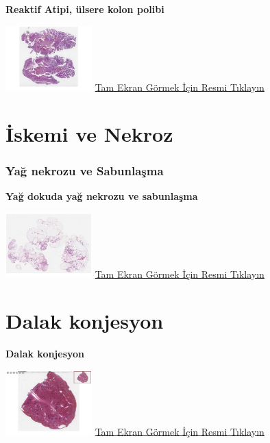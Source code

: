 \documentclass[
  letterpaper,
  DIV=11,
  numbers=noendperiod]{scrreprt}
\begin{document}
\textbf{Reaktif Atipi, ülsere kolon polibi}

\href{https://images.patolojiatlasi.com/reactive-atypia/HE.html}{\includegraphics[width=0.25\textwidth,height=\textheight]{./screenshots/thumbnail_reactive-atypia.png}}
\href{https://images.patolojiatlasi.com/reactive-atypia/HE.html}{Tam
Ekran Görmek İçin Resmi Tıklayın}

\hypertarget{sec-iskemi-ve-nekroz}{%
\chapter{İskemi ve Nekroz}\label{sec-iskemi-ve-nekroz}}

\hypertarget{sec-yag-nekrozu-sabunlasma}{%
\subsection{Yağ nekrozu ve
Sabunlaşma}\label{sec-yag-nekrozu-sabunlasma}}

\textbf{Yağ dokuda yağ nekrozu ve sabunlaşma}

\href{https://images.patolojiatlasi.com/fat-necrosis/HE.html}{\includegraphics[width=0.25\textwidth,height=\textheight]{./screenshots/thumbnail_fat-necrosis.png}}
\href{https://images.patolojiatlasi.com/fat-necrosis/HE.html}{Tam Ekran
Görmek İçin Resmi Tıklayın}

\hypertarget{sec-congestion-spleen}{%
\chapter{Dalak konjesyon}\label{sec-congestion-spleen}}

\textbf{Dalak konjesyon}

\href{https://images.patolojiatlasi.com/congestion-spleen/HE.html}{\includegraphics[width=0.25\textwidth,height=\textheight]{./screenshots/thumbnail_congestion-spleen.png}}
\href{https://images.patolojiatlasi.com/congestion-spleen/HE.html}{Tam
Ekran Görmek İçin Resmi Tıklayın}
\end{document}
